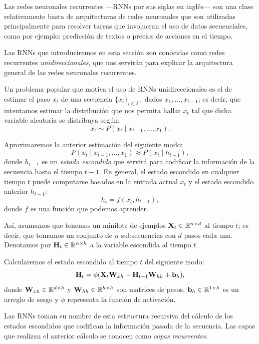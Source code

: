 \documentclass[12pt]{article}
\newcommand{\R}{\mathbb{R}}
\newcommand{\Z}{\mathbb{Z}}
\newcommand{\X}{\bm{\textbf X}}
\newcommand{\hi}{\bm{\textbf H}}
\newcommand{\we}{\bm{\textbf W}}
\newcommand{\bi}{\bm{\textbf b}}
\begin{document}
Las redes neuronales recurrentes ---RNNs por sus siglas en inglés--- son una clase relativamente basta de arquitecturas de redes neuronales que son utilizadas principalmente para resolver tareas que involucran el uso de datos secuenciales, como por ejemplo: predicción de textos o precios de acciones en el tiempo.

Las RNNs que introduciremos en esta sección son conocidas como redes recurrentes \textit{unidireccionales}, que nos servirán para explicar la arquitectura general de las redes neuronales recurrentes. 

Un problema popular que motiva el uso de RNNs unidireccionales es el de estimar el paso $ x_{t} $ de una secuencia $ \{x_i \}_{i \in \Z^{+}} $ dados $ x_1, \ldots, x_{t-1} $; es decir, que intentamos estimar la distribución que nos permita hallar $ x_t $ tal que dicha variable aleatoria se distribuya según:
\begin{equation}
    x_{t} \sim P(x_{t} \mid x_{t-1}, \ldots, x_1).
\end{equation}

Aproximaremos la anterior estimación del siguiente modo:
\begin{equation}
    P(x_{t} \mid x_{t-1}, \ldots, x_1) \approx P(x_t \mid h_{t-1}),
\end{equation}
donde $ h_{t-1} $ es un \textit{estado escondido} que servirá para codificar la información de la secuencia hasta el tiempo $ t-1 $. En general, el estado escondido en cualquier tiempo $ t $ puede computarse basados en la entrada actual $ x_t $ y el estado escondido anterior $ h_{t-1} $:
\[ h_{t} = f(x_t, h_{t-1}), \]
donde $ f $ es una función que podemos aprender. 

Así, asumamos que tenemos un minilote de ejemplos $ \X_t \in \R^{n \times d} $ al tiempo $ t $; es decir, que tomamos un conjunto de $ n $ subsecuencias con $ d $ pasos cada una. Denotamos por $ \hi_t \in \R^{n \times h} $ a la variable escondida al tiempo $ t $.

Calcularemos el estado escondido al tiempo $ t $ del siguiente modo:
\begin{equation}
    \hi_t = \phi(\X_t \we_{xh} + \hi_{t-1}\we_{hh} + \bi_h), \label{eq:rnn}
\end{equation}
donde $ \we_{xh} \in \R^{d\times h} $ y $ \we_{hh} \in \R^{h\times h} $ son matrices de pesos, $ \bi_h \in \R^{1 \times h} $ es un arreglo de sesgo y $ \phi $ representa la función de activación.

Las RNNs toman su nombre de esta estructura recursiva del cálculo de los estados escondidos que codifican la información pasada de la secuencia. Las capas que realizan el anterior cálculo se conocen como \textit{capas recurrentes}.
\end{document}
